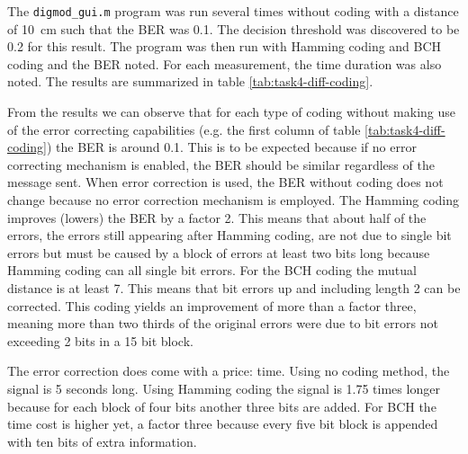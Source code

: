 \documentclass[11pt,titlepage]{report}
\begin{document}
The \texttt{digmod\_gui.m} program was run several times without coding with a distance of \SI{10}{\centi \meter} such that the BER was 0.1. The decision threshold was discovered to be 0.2 for this result. The program was then run with Hamming coding and BCH coding and the BER noted. For each measurement, the time duration was also noted. The results are summarized in table \ref{tab:task4-diff-coding}.

From the results we can observe that for each type of coding without making use of the error correcting capabilities (e.g. the first column of table \ref{tab:task4-diff-coding}) the BER is around 0.1. This is to be expected because if no error correcting mechanism is enabled, the BER should be similar regardless of the message sent. When error correction is used, the BER without coding does not change because no error correction mechanism is employed. The Hamming coding improves (lowers) the BER by a factor 2. This means that about half of the errors, the errors still appearing after Hamming coding, are not due to single bit errors but must be caused by a block of errors at least two bits long because Hamming coding can all single bit errors.
For the BCH coding the mutual distance is at least 7. This means that bit errors up and including length 2 can be corrected. This coding yields an improvement of more than a factor three, meaning more than two thirds of the original errors were due to bit errors not exceeding 2 bits in a 15 bit block.

The error correction does come with a price: time. Using no coding method, the signal is 5 seconds long. Using Hamming coding the signal is 1.75 times longer because for each block of four bits another three bits are added. For BCH the time cost is higher yet, a factor three because every five bit block is appended with ten bits of extra information.
\end{document}
